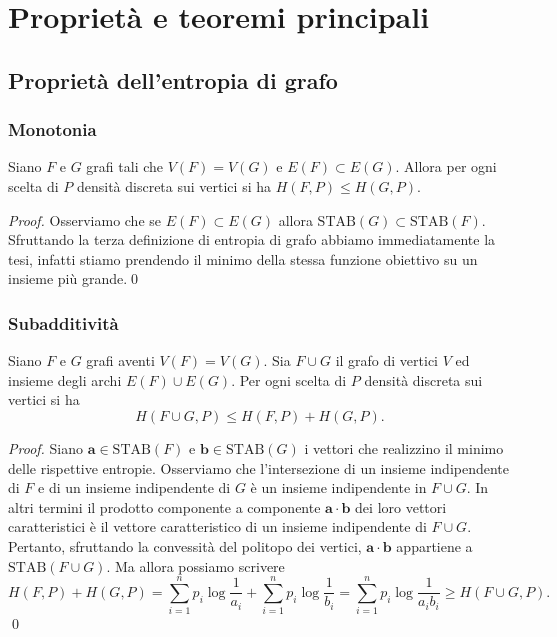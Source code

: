 \chapter{Proprietà e teoremi principali} 
\section{Proprietà dell'entropia di grafo} 
\subsection{Monotonia} 
\begin{lemma}
  Siano \(F\) e \(G\) grafi tali che \(V(F)=V(G)\) e \(E(F)\subset E(G)\). Allora per ogni scelta di \(P\) densità discreta sui vertici si ha \(H(F,P)\le H(G,P)\). 
\end{lemma}
\begin{proof}
  Osserviamo che se \(E(F)\subset E(G)\) allora \(\text{STAB}(G)\subset \text{STAB}(F)\). Sfruttando la terza definizione di entropia di grafo abbiamo immediatamente la tesi, infatti stiamo prendendo il minimo della stessa funzione obiettivo su un insieme più grande.\qed 
\end{proof}

\subsection{Subadditività} 
\begin{lemma}
  Siano \(F\) e \(G\) grafi aventi \(V(F) = V(G)\). Sia \(F\cup G\) il grafo di vertici \(V\) ed insieme degli archi \(E(F)\cup E(G)\). Per ogni scelta di \(P\) densità discreta sui vertici si ha
  \[H(F\cup G,P)\le H(F,P)+H(G,P).\]
\end{lemma}
\begin{proof}
  Siano \(\mathbf{a}\in \text{STAB}(F)\) e \(\mathbf{b}\in \text{STAB}(G)\) i vettori che realizzino il minimo delle rispettive entropie. Osserviamo che l'intersezione di un insieme indipendente di \(F\) e di un insieme indipendente di \(G\) è un insieme indipendente in \(F\cup G\). In altri termini il prodotto componente a componente \(\mathbf{a}\cdot \mathbf{b}\) dei loro vettori caratteristici è il vettore caratteristico di un insieme indipendente di \(F\cup G\). Pertanto, sfruttando la convessità del politopo dei vertici, \(\mathbf{a}\cdot \mathbf{b}\) appartiene a \(\text{STAB}(F\cup G)\). Ma allora possiamo scrivere
  \[H(F,P)+H(G,P)=\sum_{i=1}^n p_i\log{\frac{1}{a_i}}+\sum_{i=1}^n p_i\log{\frac{1}{b_i}}=\sum_{i=1}^n p_i\log{\frac{1}{a_{i}b_{i}}}\ge H(F\cup G,P).\]
  \qed 
\end{proof}


